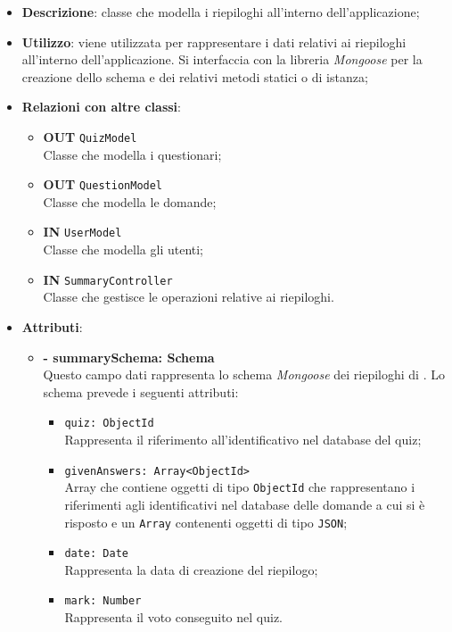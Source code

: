 \begin{itemize}
	\item \textbf{Descrizione}: classe che modella i riepiloghi all'interno dell'applicazione;
	\item \textbf{Utilizzo}: viene utilizzata per rappresentare i dati relativi ai riepiloghi all'interno dell'applicazione. Si interfaccia con la libreria \textit{Mongoose} per la creazione dello schema e dei relativi metodi statici o di istanza;
	\item \textbf{Relazioni con altre classi}:
		\begin{itemize}
			\item \textbf{OUT} \texttt{QuizModel}\\
			Classe che modella i questionari;
			\item \textbf{OUT} \texttt{QuestionModel}\\
			Classe che modella le domande;
			\item \textbf{IN} \texttt{UserModel}\\
			Classe che modella gli utenti;
			\item \textbf{IN} \texttt{SummaryController}\\
			Classe che gestisce le operazioni relative ai riepiloghi.
		\end{itemize}
	\item \textbf{Attributi}:
		\begin{itemize}
			\item \textbf{- summarySchema: Schema} \\
			Questo campo dati rappresenta lo schema \textit{Mongoose} dei riepiloghi di \progetto. Lo schema prevede i seguenti attributi:
				\begin{itemize}
					\item \texttt{quiz: ObjectId}\\ Rappresenta il riferimento all'identificativo nel database del quiz;
					\item \texttt{givenAnswers: Array<ObjectId>}\\ Array che contiene oggetti di tipo \texttt{ObjectId} che rappresentano i riferimenti agli identificativi nel database delle domande a cui si è risposto e un \texttt{Array} contenenti oggetti di tipo \texttt{JSON};	
					\item \texttt{date: Date}\\ Rappresenta la data di creazione del riepilogo;
					\item \texttt{mark: Number}\\ Rappresenta il voto conseguito nel quiz.

\end{itemize}
\end{itemize}
\end{itemize}
